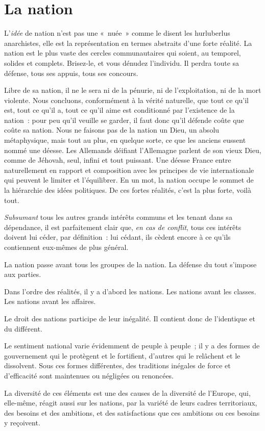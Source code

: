 \documentclass[french,twoside]{book} %
\newcommand{\astermono}{\medskip\centerline{\color{rubric}\large\selectfont{\syms ✻}}\medskip\par}%
\begin{document}
\section[{La nation}]{La nation}
\noindent L’\emph{idée} de nation n’est pas une « nuée » comme le disent les hurluberlus anarchistes, elle est la représentation en termes abstraits d’une forte réalité. La nation est le plus vaste des cercles communautaires qui soient, au temporel, solides et complets. Brisez-le, et vous dénudez l’individu. Il perdra toute sa défense, tous ses appuis, tous ses concours.\par
Libre de sa nation, il ne le sera ni de la pénurie, ni de l’exploitation, ni de la mort violente. Nous concluons, conformément à la vérité naturelle, que tout ce qu’il est, tout ce qu’il a, tout ce qu’il aime est conditionné par l’existence de la nation : pour peu qu’il veuille se garder, il faut donc qu’il défende coûte que coûte sa nation. Nous ne faisons pas de la nation un Dieu, un absolu métaphysique, mais tout au plus, en quelque sorte, ce que les anciens eussent nommé une déesse. Les Allemands déifiant l’Allemagne parlent de son vieux Dieu, comme de Jéhovah, seul, infini et tout puissant. Une déesse France entre naturellement en rapport et composition avec les principes de vie internationale qui peuvent le limiter et l’équilibrer. En un mot, la nation occupe le sommet de la hiérarchie des idées politiques. De ces fortes réalités, c’est la plus forte, voilà tout.\par
\emph{Subsumant} tous les autres grands intérêts communs et les tenant dans sa dépendance, il est parfaitement clair que, \emph{en cas de conflit}, tous ces intérêts doivent lui céder, par définition : lui cédant, ils cèdent encore à ce qu’ils contiennent eux-mêmes de plus général.\par

\astermono

\noindent La nation passe avant tous les groupes de la nation. La défense du tout s’impose aux parties.\par

\astermono

\noindent Dans l’ordre des réalités, il y a d’abord les nations. Les nations avant les classes. Les nations avant les affaires.\par

\astermono

\noindent Le droit des nations participe de leur inégalité. Il contient donc de l’identique et du différent.\par
Le sentiment national varie évidemment de peuple à peuple ; il y a des formes de gouvernement qui le protègent et le fortifient, d’autres qui le relâchent et le dissolvent. Sous ces formes différentes, des traditions inégales de force et d’efficacité sont maintenues ou négligées ou renoncées.\par
La diversité de ces éléments est une des causes de la diversité de l’Europe, qui, elle-même, réagit aussi sur les nations, par la variété de leurs cadres territoriaux, des besoins et des ambitions, et des satisfactions que ces ambitions ou ces besoins y reçoivent.\par
\end{document}
